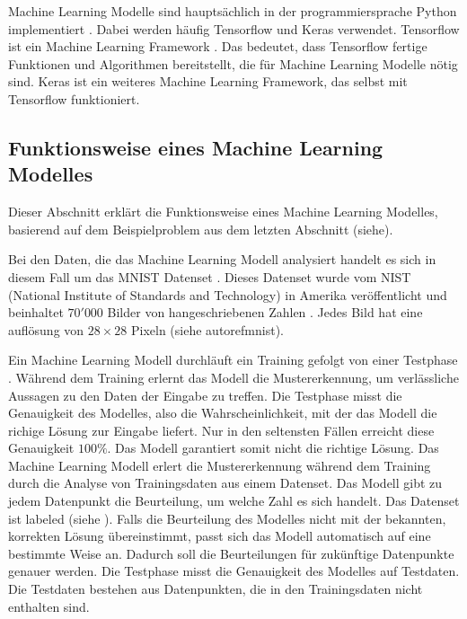 Machine Learning Modelle sind hauptsächlich in der programmiersprache Python
implementiert \cite{sadie_bennett_why_2019}. Dabei werden häufig Tensorflow und Keras
verwendet. Tensorflow ist ein Machine Learning Framework
\cite{noauthor_tensorflow_nodate}. Das bedeutet, dass Tensorflow fertige
Funktionen und Algorithmen bereitstellt, die für Machine Learning Modelle nötig
sind. Keras ist ein weiteres Machine Learning Framework, das selbst mit
Tensorflow funktioniert.


\subsection{Funktionsweise eines Machine Learning Modelles}\label{sub:t_ml_func}
Dieser Abschnitt erklärt die Funktionsweise eines Machine Learning Modelles,
basierend auf dem Beispielproblem aus dem letzten Abschnitt (siehe). 

Bei den Daten, die das Machine Learning Modell analysiert handelt es sich in
diesem Fall um das MNIST Datenset \cite{noauthor_mnist_nodate}. Dieses Datenset
wurde vom NIST (National Institute of Standards and Technology) in Amerika
veröffentlicht und beinhaltet $70'000$ Bilder von hangeschriebenen Zahlen
\cite{noauthor_emnist_2017}. Jedes Bild hat eine auflösung von $28\times28$
Pixeln (siehe autoref{mnist}). %

                
Ein Machine Learning Modell durchläuft ein Training gefolgt von einer Testphase
\cite{noauthor_training_nodate}. Während dem Training erlernt das Modell die Mustererkennung,
um verlässliche Aussagen zu den Daten der Eingabe zu treffen. Die Testphase
misst die Genauigkeit des Modelles, also die Wahrscheinlichkeit, mit der das
Modell die richige Lösung zur Eingabe liefert. Nur in den seltensten Fällen
erreicht diese Genauigkeit $100\%$. Das Modell garantiert somit nicht die
richtige Lösung. Das Machine Learning Modell erlert die Mustererkennung während
dem Training durch die Analyse von Trainingsdaten aus einem Datenset. Das Modell
gibt zu jedem Datenpunkt die Beurteilung, um welche Zahl es sich handelt. Das
Datenset ist labeled (siehe ). Falls die Beurteilung des
Modelles nicht mit der bekannten, korrekten Lösung übereinstimmt, passt sich das
Modell automatisch auf eine bestimmte Weise an. Dadurch soll die Beurteilungen
für zukünftige Datenpunkte genauer werden. Die Testphase misst die Genauigkeit
des Modelles auf Testdaten. Die Testdaten bestehen aus Datenpunkten, die in den
Trainingsdaten nicht enthalten sind.

